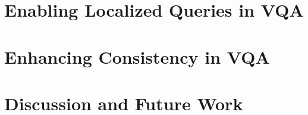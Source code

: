 \documentclass[a4paper,11pt]{DoctoralThesis}
\begin{document}
\part{Enabling Localized Queries in VQA}
\label{part:localized}


\part{Enhancing Consistency in VQA}
\label{part:consistency}


\part{Discussion and Future Work}
\label{part:discussion_future}


\cleardoublepage
{}

%
\printbibliography[heading=bibintoc]


\backmatter
%



\end{document}
